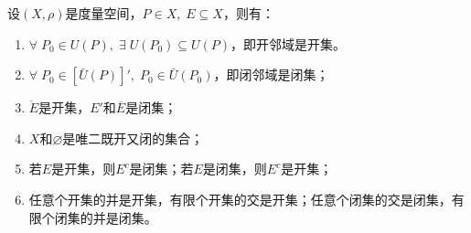 \begin{property}\label{prop:OpenClosedSet}
	设$(X,\rho)$是度量空间，$P\in X,\;E\subseteq X$，则有：
	\begin{enumerate}
		\item $\forall\;P_0\in U(P),\;\exists\;U(P_0)\subseteq U(P)$，即开邻域是开集。
		\item $\forall\;P_0\in[\bar{U}(P)]',\;P_0\in \bar{U}(P_0)$，即闭邻域是闭集；
		\item $\mathring{E}$是开集，$E'$和$\overline{E}$是闭集；
		\item $X$和$\varnothing$是唯二既开又闭的集合；
		\item 若$E$是开集，则$E^c$是闭集；若$E$是闭集，则$E^c$是开集；
		\item 任意个开集的并是开集，有限个开集的交是开集；任意个闭集的交是闭集，有限个闭集的并是闭集。
	\end{enumerate}
\end{property}
